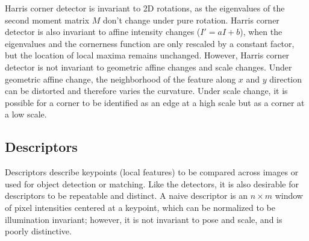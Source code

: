 \documentclass[twoside]{article}
\begin{document}
Harris corner detector is invariant to 2D rotations, as the eigenvalues of the second moment matrix $M$ don't change under pure rotation. Harris corner detector is also invariant to affine intensity changes ($I' = aI+b$), when the eigenvalues and the cornerness function are only rescaled by a constant factor, but the location of local maxima remains unchanged. However, Harris corner detector is not invariant to geometric affine changes and scale changes. Under geometric affine change, the neighborhood of the feature along $x$ and $y$ direction can be distorted and therefore varies the curvature. Under scale change, it is possible for a corner to be identified as an edge at a high scale but as a corner at a low scale. 

\subsection{Descriptors}
Descriptors describe keypoints (local features) to be compared across images or used for object detection or matching. Like the detectors, it is also desirable for descriptors to be repeatable and distinct. A naive descriptor is an $n\times m$ window of pixel intensities centered at a keypoint, which can be normalized to be illumination invariant; however, it is not invariant to pose and scale, and is poorly distinctive. 
\end{document}
